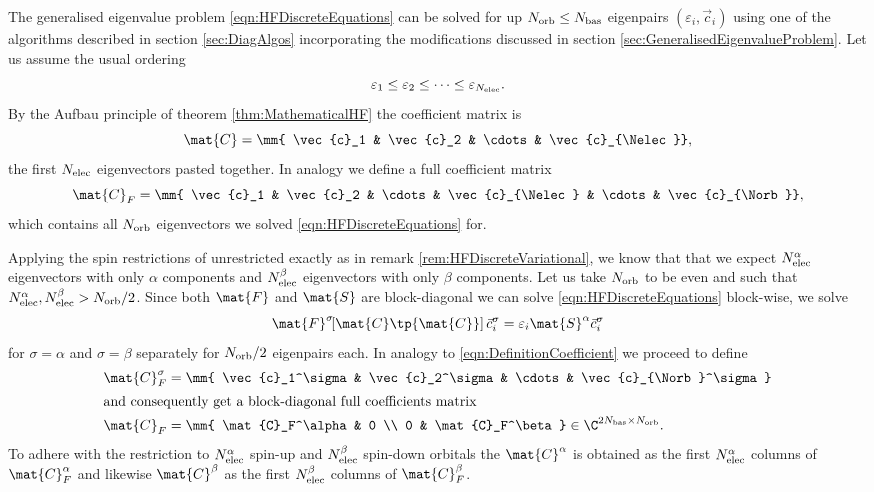 \begin{rem}
The generalised eigenvalue problem \eqref{eqn:HFDiscreteEquations}
can be solved for up $N_\text{orb} \leq N_\text{bas}$ eigenpairs
$(\varepsilon_i, \vec{c}_i)$
using one of the algorithms described in section \vref{sec:DiagAlgos}
incorporating the modifications discussed in
section \ref{sec:GeneralisedEigenvalueProblem}.
Let us assume the usual ordering
\[ \varepsilon_1 \leq \varepsilon_2 \leq \cdots \leq \varepsilon_{N_\text{elec}}. \]
By the Aufbau principle of theorem \ref{thm:MathematicalHF}
the coefficient matrix is
\[ \mat{C} = \mm{ \vec{c}_1 & \vec{c}_2 & \cdots & \vec{c}_{\Nelec}}, \]
\ie the first $N_\text{elec}$ eigenvectors pasted together.
In analogy we define a full coefficient matrix
\begin{equation}
	\mat{C}_F = \mm{ \vec{c}_1 & \vec{c}_2 & \cdots & \vec{c}_{\Nelec} & \cdots & \vec{c}_{\Norb}},
	\label{eqn:DefinitionCoefficient}
\end{equation}
which contains all $N_\text{orb}$
eigenvectors we solved \eqref{eqn:HFDiscreteEquations} for.

Applying the spin restrictions of unrestricted \HF
exactly as in remark \ref{rem:HFDiscreteVariational},
we know that that we expect $N_\text{elec}^\alpha$ eigenvectors
with only $\alpha$ components and $N_\text{elec}^\beta$ eigenvectors with only $\beta$ components.
Let us take $N_\text{orb}$ to be even and such that $N_\text{elec}^\alpha, N_\text{elec}^\beta > N_\text{orb}/2$.
Since both $\mat{F}$ and $\mat{S}$ are block-diagonal
we can solve \eqref{eqn:HFDiscreteEquations} block-wise,
\ie we solve
\[
	\mat{F}^\sigma\!\!\left[\mat{C}\tp{\mat{C}}\right] \vec{c}_i^\sigma
	= \varepsilon_i \mat{S}^\alpha \vec{c}_i^\sigma
\]
for $\sigma = \alpha$ and $\sigma = \beta$
separately for $N_\text{orb}/2$ eigenpairs each.
In analogy to \eqref{eqn:DefinitionCoefficient} we proceed to define
\begin{align*}
	 \mat{C}_F^\sigma &= \mm{ \vec{c}_1^\sigma & \vec{c}_2^\sigma &
		\cdots & \vec{c}_{\Norb}^\sigma} \\
\intertext{and consequently get a block-diagonal full coefficients matrix}
	\mat{C}_F &= \mm{ \mat{C}_F^\alpha & 0 \\ 0 & \mat{C}_F^\beta }
		\in \C^{2\Nbas\times \Norb}.
\end{align*}
To adhere with the restriction to $N_\text{elec}^\alpha$ spin-up
and $N_\text{elec}^\beta$ spin-down orbitals
the 
$\mat{C}^\alpha$ is obtained as the first $N_\text{elec}^\alpha$ columns of $\mat{C}_F^\alpha$
and likewise $\mat{C}^\beta$ as the first $N_\text{elec}^\beta$ columns of $\mat{C}_F^\beta$.


\end{rem}

